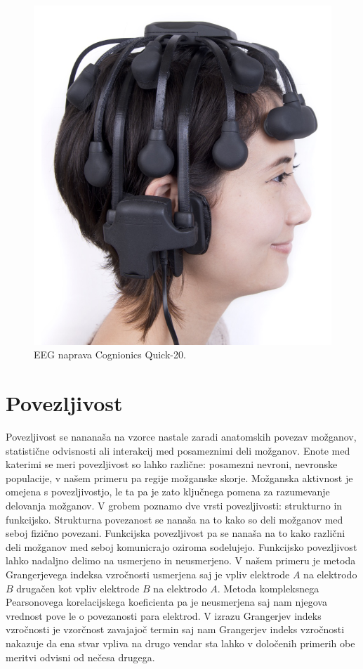 \begin{figure}[h!]
    \begin{center}
    \includegraphics[width=0.5\linewidth]{slike/Cognionics Quick-20.png}
    \end{center}
    \caption{EEG naprava Cognionics Quick-20. \cite{CognionicsQUICK20User}}
    \end{figure}

\section{Povezljivost}
Povezljivost se nananaša na vzorce nastale zaradi anatomskih povezav možganov, statistične odvisnosti ali interakcij med posameznimi deli možganov.  Enote med katerimi se meri povezljivost so lahko različne: posamezni nevroni, nevronske populacije, v našem primeru pa regije možganske skorje. Možganska aktivnost je omejena s povezljivostjo, le ta pa je zato ključnega pomena za razumevanje delovanja možganov. V grobem poznamo dve vrsti povezljivosti: strukturno in funkcijsko. Strukturna povezanost se nanaša na to kako so deli možganov med seboj fizično povezani. Funkcijska povezljivost pa se nanaša na to kako različni deli možganov med seboj komunicrajo oziroma sodelujejo.\cite{spornsBrainConnectivity2007} Funkcijsko povezljivost lahko nadaljno delimo na usmerjeno in neusmerjeno. V našem primeru je metoda Grangerjevega indeksa vzročnosti usmerjena saj je vpliv elektrode $A$ na elektrodo $B$ drugačen kot vpliv elektrode $B$ na elektrodo $A$. Metoda kompleksnega Pearsonovega korelacijskega koeficienta pa je neusmerjena saj nam njegova vrednost pove le o povezanosti para elektrod.
V izrazu Grangerjev indeks vzročnosti je vzorčnost zavajajoč termin saj nam Grangerjev indeks vzročnosti nakazuje da ena stvar vpliva na drugo vendar sta lahko v določenih primerih obe meritvi odvisni od nečesa drugega. 
